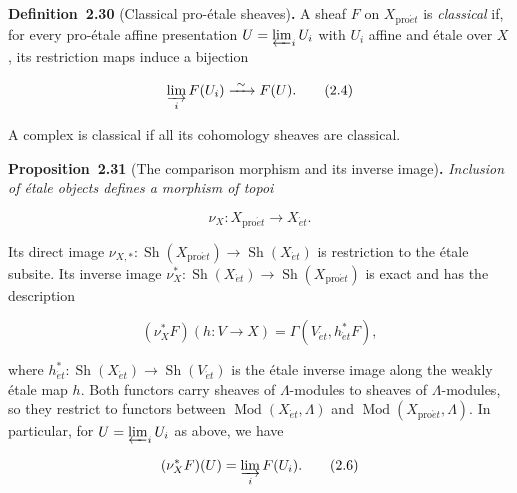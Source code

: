 \documentclass[11pt]{article}
\newenvironment{bpstatement}[2]{\par\addvspace{0.6\baselineskip}\noindent\textbf{#1}#2\textbf{.}\enspace\ignorespaces}
  {\par\addvspace{0.4\baselineskip}}
\newenvironment{bpstatementit}[2]{\begin{bpstatement}{#1}{#2}\itshape\ignorespaces}{\end{bpstatement}}
\providecommand{\Sh}{}\renewcommand{\Sh}{\operatorname{Sh}}
\begin{document}
\label{bp89}%
\begin{bpstatement}{Definition~2.30}{ (Classical pro-étale sheaves)}
A sheaf \(F\) on \(X_{\mathrm{pro}\acute{e}t}\) is \emph{classical} if, for every pro-étale affine presentation \(U=\varprojlim_i U_i\) with \(U_i\) affine and étale over \(X\), its restriction maps induce a bijection

\[
\varinjlim_i F(U_i)\xrightarrow{\ \sim\ }F(U).
\tag{2.4}
\]

A complex is classical if all its cohomology sheaves are classical.
\end{bpstatement}

\label{bp90}%
\begin{bpstatementit}{Proposition~2.31}{ (The comparison morphism and its inverse image)}
Inclusion of étale objects defines a morphism of topoi

\[
\nu_X:X_{\mathrm{pro}\acute{e}t}\longrightarrow X_{\acute{e}t}.
\]

Its direct image \(\nu_{X,*}:\Sh(X_{\mathrm{pro}\acute{e}t})\to\Sh(X_{\acute{e}t})\) is restriction to the étale subsite. Its inverse image \(\nu_X^*:\Sh(X_{\acute{e}t})\to\Sh(X_{\mathrm{pro}\acute{e}t})\) is exact and has the description

\[
(\nu_X^*F)(h:V\to X)
=\Gamma(V_{\acute{e}t},h_{\acute{e}t}^*F),
\tag{2.5}
\]

where \(h_{\acute{e}t}^*:\Sh(X_{\acute{e}t})\to\Sh(V_{\acute{e}t})\) is the étale inverse image along the weakly étale map \(h\). Both functors carry sheaves of \(\Lambda\)-modules to sheaves of \(\Lambda\)-modules, so they restrict to functors between \(\operatorname{Mod}(X_{\acute{e}t},\Lambda)\) and \(\operatorname{Mod}(X_{\mathrm{pro}\acute{e}t},\Lambda)\). In particular, for \(U=\varprojlim_iU_i\) as above, we have

\[
(\nu_X^*F)(U)=\varinjlim_i F(U_i).
\tag{2.6}
\]
\end{bpstatementit}
\end{document}
